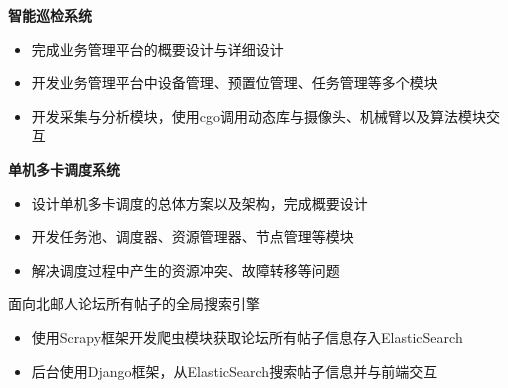 \documentclass{resume}
\begin{document}
\textbf{智能巡检系统}
\begin{itemize}
  \item 完成业务管理平台的概要设计与详细设计
  \item 开发业务管理平台中设备管理、预置位管理、任务管理等多个模块
  \item 开发采集与分析模块，使用cgo调用动态库与摄像头、机械臂以及算法模块交互
\end{itemize}

\textbf{单机多卡调度系统}
\begin{itemize}
  \item 设计单机多卡调度的总体方案以及架构，完成概要设计
  \item 开发任务池、调度器、资源管理器、节点管理等模块
  \item 解决调度过程中产生的资源冲突、故障转移等问题
\end{itemize}

\begin{onehalfspacing}
面向北邮人论坛所有帖子的全局搜索引擎
\begin{itemize}
  \item 使用Scrapy框架开发爬虫模块获取论坛所有帖子信息存入ElasticSearch
  \item 后台使用Django框架，从ElasticSearch搜索帖子信息并与前端交互
\end{itemize}
\end{onehalfspacing}


\end{document}

